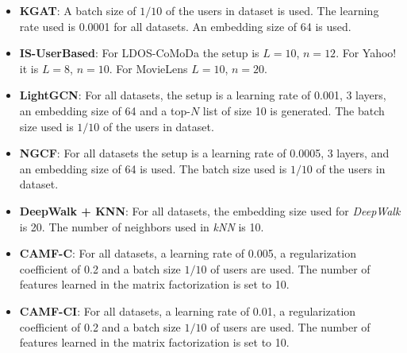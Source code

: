 \begin{itemize}
    \item \textbf{KGAT}: A batch size of $1/10$ of the users in dataset is used. The learning rate used is 0.0001 for all datasets. An embedding size of 64 is used.
    \item \textbf{IS-UserBased}: For LDOS-CoMoDa the setup is $L=10$, $n=12$. For Yahoo! it is $L=8$, $n=10$. For MovieLens $L=10$, $n=20$.
    \item \textbf{LightGCN}: For all datasets, the setup is a learning rate of 0.001, 3 layers, an embedding size of 64 and a top-$N$ list of size 10 is generated. The batch size used is $1/10$ of the users in dataset.
    \item \textbf{NGCF}: For all datasets the setup is a learning rate of 0.0005, 3 layers, and an embedding size of 64 is used. The batch size used is $1/10$ of the users in dataset.
    \item \textbf{DeepWalk + KNN}: For all datasets, the embedding size used for \textit{DeepWalk} is 20. The number of neighbors used in \textit{kNN} is 10.
    \item \textbf{CAMF-C}: For all datasets, a learning rate of 0.005, a regularization coefficient of 0.2 and a batch size $1/10$ of users are used. The number of features learned in the matrix factorization is set to 10.
    \item \textbf{CAMF-CI}: For all datasets, a learning rate of 0.01, a regularization coefficient of 0.2 and a batch size $1/10$ of users are used. The number of features learned in the matrix factorization is set to 10.
\end{itemize}

